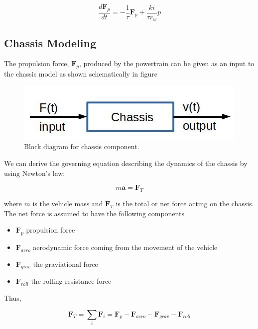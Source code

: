 \begin{equation}
\frac{d\mathbf{F}_p}{dt} = - \frac{1}{\tau}\mathbf{F}_p + \frac{ki}{\tau r_w} p   
\label{engine_model_II}
\end{equation}

\subsection{Chassis Modeling}
The propulsion force, $\mathbf{F}_p$, produced by the powertrain can be given as an input to the chassis model as shown schematically in figure

 
\begin{figure}[!htb]
\begin{center}
\includegraphics[scale=0.280]{img/model_automotive_sys/chassis_block_diagram.jpg}
\end{center}
\caption{Block diagram for chassis component.}
\label{chassis_block_diagram}
\end{figure}

We can derive the governing equation describing the dynamics of the chassis by using Newton's law:

\begin{equation}
m\mathbf{a} =  \mathbf{F}_T 
\label{chassis_force_balance}
\end{equation}

where $m$ is the vehicle mass and $\mathbf{F}_T$ is the total or net force acting on the chassis. The net force is assumed to have the following components 

\begin{itemize}
\item $\mathbf{F}_p$ propulsion force
\item $\mathbf{F}_{aero}$ aerodynamic force coming from the movement of the vehicle
\item $\mathbf{F}_{grav}$ the graviational force
\item $\mathbf{F}_{roll}$ the rolling resistance force
\end{itemize}

Thus,

\begin{equation}
\mathbf{F}_T = \sum_{i} \mathbf{F}_i =  \mathbf{F}_p -  \mathbf{F}_{aero} - \mathbf{F}_{grav} -  \mathbf{F}_{roll}
\label{chassis_model_total_force}
\end{equation}

